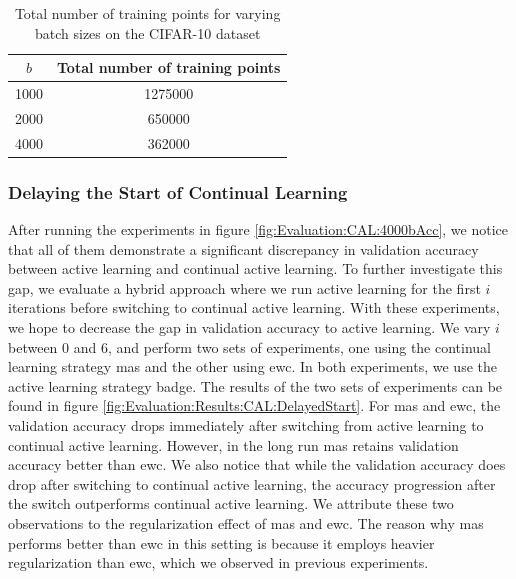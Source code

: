 \begin{table}[h]
    \centering
    \begin{tabular}{c | c } 
        $b$ & Total number of training points \\
        \hline 
        1000 & 1275000 \\
        2000 & 650000 \\
        4000 & 362000 \\
    \end{tabular}
    \caption{Total number of training points for varying batch sizes on the CIFAR-10 dataset}
    \label{fig:Evaluation:CAL:NumberOfTrainingPoints}
\end{table}


\subsubsection{Delaying the Start of Continual Learning}
\label{sec:Evaluation:CAL:ALRegCL:Hybrid}
After running the experiments in figure \ref{fig:Evaluation:CAL:4000bAcc}, we notice that all of them demonstrate a significant discrepancy in validation accuracy
between active learning and continual active learning. To further investigate this gap, we evaluate a hybrid approach where we run active learning for the first $i$
iterations before switching to continual active learning. With these experiments, we hope to decrease the gap in validation accuracy to active learning. We vary $i$
between 0 and 6, and perform two sets of experiments, one using the continual learning strategy \gls{mas} and the other using \gls{ewc}. In both experiments, we use
the active learning strategy \gls{badge}. The results of the two sets of experiments can be found in figure  \ref{fig:Evaluation:Results:CAL:DelayedStart}. For \gls{mas}
and \gls{ewc}, the validation accuracy drops immediately after switching from active learning to continual active learning. However, in the long run \gls{mas}
retains validation accuracy better than \gls{ewc}. We also notice that while the validation accuracy does drop after switching to continual active learning, the accuracy
progression after the switch outperforms continual active learning. We attribute these two observations to the regularization effect of \gls{mas} and \gls{ewc}. 
The reason why \gls{mas} performs better than \gls{ewc} in this setting is because it employs heavier regularization than \gls{ewc}, which we observed in previous
experiments. \par

